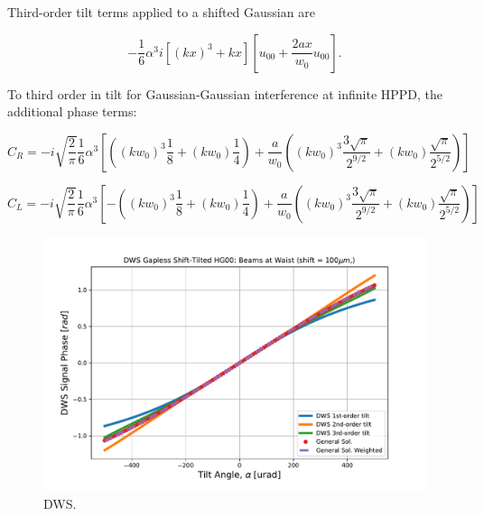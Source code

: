 \documentclass[aps,twoside,secnumarabic,balancelastpage,amsmath,amssymb,nofootinbib,hyperref=pdftex]{revtex4}
\begin{document}
Third-order tilt terms applied to a shifted Gaussian are

\begin{equation}
-\frac{1}{6} \alpha^3 i [(kx)^3+kx]
[u_{00} + \frac{2ax}{w_0} u_{00}]
.
\end{equation}

To third order in tilt for Gaussian-Gaussian interference at infinite HPPD, the additional phase terms:

\begin{equation}
C_R=
    - i
    \sqrt{\frac{2}{\pi}}
    \frac{1}{6}
    \alpha^3
    [
        (
            (k w_0)^3 \frac{1}{8}
            +
            (k w_0) \frac {1}{4}
        )
        +
        \frac{a}{w_0}
        (
            (k w_0)^3 \frac{3 \sqrt{\pi}}{2^{9/2}}
            +
            (k w_0) \frac{\sqrt{\pi}}{2^{5/2}}
        )
    ]   
\end{equation}

\begin{equation}
C_L=
    - i
    \sqrt{\frac{2}{\pi}}
    \frac{1}{6}
    \alpha^3
    [
    -
        (
            (k w_0)^3 \frac{1}{8}
            +
            (k w_0) \frac {1}{4}
        )
        +
        \frac{a}{w_0}
        (
            (k w_0)^3 \frac{3 \sqrt{\pi}}{2^{9/2}}
            +
            (k w_0) \frac{\sqrt{\pi}}{2^{5/2}}
        )
    ]   
\end{equation}

\clearpage

	\begin{figure}
	\centering
	\includegraphics[scale=.65]{DWS_tiltshift_HG00HG00_HPPD}
	\caption{DWS.}
	\end{figure}
	
\end{document}
